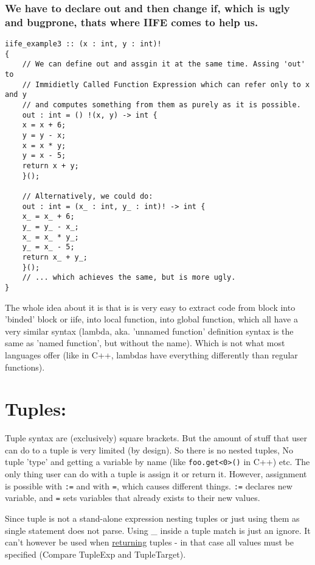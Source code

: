 \documentclass[11pt]{article}
\begin{document}
\subsubsection*{We have to declare out and then change if, which is ugly and bugprone, thats where IIFE comes to help us.}
\label{sec:org7ffd015}
\begin{verbatim}
iife_example3 :: (x : int, y : int)!
{
    // We can define out and assgin it at the same time. Assing 'out' to
    // Immidietly Called Function Expression which can refer only to x and y
    // and computes something from them as purely as it is possible.
    out : int = () !(x, y) -> int {
	x = x + 6;
	y = y - x;
	x = x * y;
	y = x - 5;
	return x + y;
    }();

    // Alternatively, we could do:
    out : int = (x_ : int, y_ : int)! -> int {
	x_ = x_ + 6;
	y_ = y_ - x_;
	x_ = x_ * y_;
	y_ = x_ - 5;
	return x_ + y_;
    }();
    // ... which achieves the same, but is more ugly.
}
\end{verbatim}

The whole idea about it is that is is very easy to extract code from block
into 'binded' block or iife, into local function, into global function,
which all have a very similar syntax (lambda, aka. 'unnamed function'
definition syntax is the same as 'named function', but without the
name). Which is not what most languages offer (like in C++, lambdas have
everything differently than regular functions).

\section*{Tuples:}
\label{sec:org37b14a6}

Tuple syntax are (exclusively) square brackets. But the amount of stuff that
user can do to a tuple is very limited (by design). So there is no nested
tuples, No tuple 'type' and getting a variable by name (like
\texttt{foo.get<0>()} in C++) etc.  The only thing user can do with a tuple is
assign it or return it. However, assignment is possible with \texttt{:=} and
with \texttt{=}, which causes different things. \texttt{:=} declares new
variable, and \texttt{=} sets variables that already exists to their new
values.

Since tuple is not a stand-alone expression nesting tuples or just using them
as single statement does not parse. Using \_ inside a tuple match is just an
ignore. It can't however be used when \uline{returning} tuples - in that case all
values must be specified (Compare TupleExp and TupleTarget).
\end{document}
